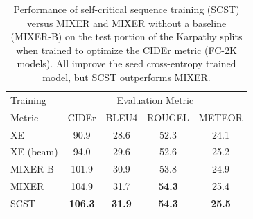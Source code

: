 \documentclass[10pt,twocolumn,letterpaper]{article}
\begin{document}
\begin{table}[ht]
\begin{center}
\begin{tabular}{l|cccc}
\hline \hline
Training & \multicolumn{4}{c}{Evaluation Metric} \\
Metric & CIDEr & BLEU4 & ROUGEL & METEOR  \\
\hline
XE & 90.9 & 28.6 & 52.3 & 24.1  \\ %
XE (beam) & 94.0 & 29.6 & 52.6 & 25.2 \\ %
\hline

MIXER-B & 101.9 & 30.9 & 53.8 & 24.9 \\ %
MIXER & 104.9 & 31.7 & {\bf 54.3} &  25.4 \\%
SCST  & {\bf 106.3} & {\bf 31.9} & {\bf 54.3} & {\bf 25.5}  \\ %
\hline \hline
\end{tabular}
\end{center}
\caption{Performance of self-critical sequence training (SCST) versus MIXER \cite{Ranzato} and MIXER without a baseline (MIXER-B) on the test portion of the Karpathy splits when trained to optimize the CIDEr metric (FC-2K models). All improve the seed cross-entropy trained model, but SCST outperforms MIXER.}
\label{rlcompare_table}
\end{table}
\vspace{-0.1in}
\end{document}
